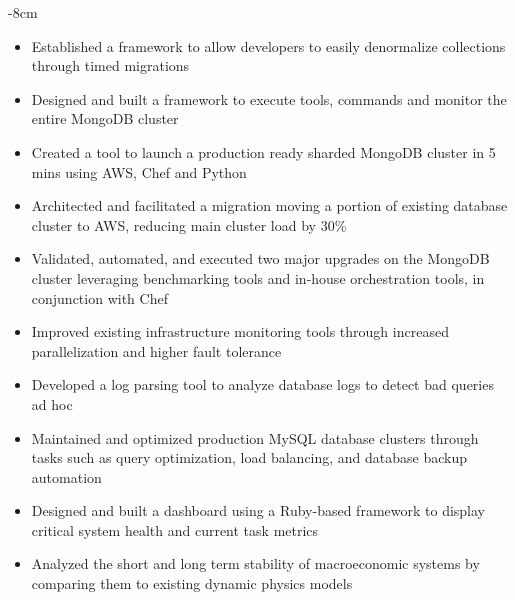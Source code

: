 \documentclass[10pt,a4paper,academicons]{altacv}
\begin{document}

\begin{adjustwidth}{}{-8cm}
\makecvheader
\end{adjustwidth}


\begin{itemize}
\item Established a framework to allow developers to easily denormalize collections through timed migrations
\item Designed and built a framework to execute tools, commands and monitor the entire MongoDB cluster
\item Created a tool to launch a production ready sharded MongoDB cluster in 5 mins using AWS, Chef and Python
\item Architected and facilitated a migration moving a portion of existing
    database cluster to AWS, reducing main cluster load by 30\%
\item Validated, automated, and executed two major upgrades on the MongoDB
    cluster leveraging benchmarking tools and in-house orchestration tools, in
        conjunction with Chef
\item Improved existing infrastructure monitoring tools through increased parallelization and higher fault tolerance
\item Developed a log parsing tool to analyze database logs to detect bad queries ad hoc
\end{itemize}

\divider

\begin{itemize}
\item Maintained and optimized production MySQL database clusters through tasks such as query optimization, load balancing, and database backup automation
\item Designed and built a dashboard using a Ruby-based framework to display critical system health and current task metrics
\end{itemize}

\divider

\begin{itemize}
\item Analyzed the short and long term stability of macroeconomic systems by
    comparing them to existing dynamic physics models
\end{itemize}
\end{document}
